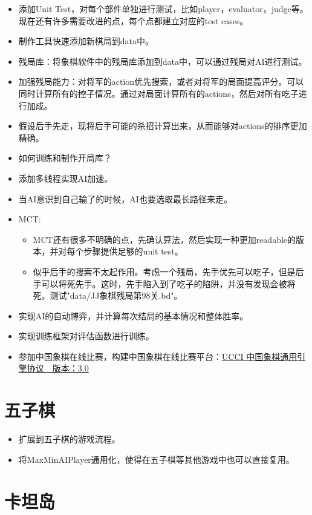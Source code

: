 \documentclass[export, 12pt, letterpaper]{ctexrep}
\begin{document}
\begin{itemize}
\item{ 添加Unit Test，对每个部件单独进行测试，比如player，evaluator，judge等。现在还有许多需要改进的点，每个点都建立对应的test cases。 }
\item{ 制作工具快速添加新棋局到data中。 }
\item{ 残局库：将象棋软件中的残局库添加到data中，可以通过残局对AI进行测试。 }
\item{ 加强残局能力：对将军的action优先搜索，或者对将军的局面提高评分。可以同时计算所有的控子情况。通过对局面计算所有的actions，然后对所有吃子进行加成。 }
\item{ 假设后手先走，现将后手可能的杀招计算出来，从而能够对actions的排序更加精确。 }
\item{ 如何训练和制作开局库？ }
\item{ 添加多线程实现AI加速。 }
\item{ 当AI意识到自己输了的时候，AI也要选取最长路径来走。 }
\item{ MCT:
\begin{itemize}
\item{ MCT还有很多不明确的点，先确认算法，然后实现一种更加readable的版本，并对每个步骤提供足够的unit test。 }
\item{ 似乎后手的搜索不太起作用。考虑一个残局，先手优先可以吃子，但是后手可以将死先手。这时，先手陷入到了吃子的陷阱，并没有发现会被将死。测试"data/JJ象棋残局第98关.bd"。 }
\end{itemize}
 }
\item{ 实现AI的自动博弈，并计算每次结局的基本情况和整体胜率。 }
\item{ 实现训练框架对评估函数进行训练。 }
\item{ 参加中国象棋在线比赛，构建中国象棋在线比赛平台：\href{https://www.xqbase.com/protocol/cchess_ucci.htm}{UCCI 中国象棋通用引擎协议　版本：3.0} }
\end{itemize}



\section{五子棋}


\begin{itemize}
\item{ 扩展到五子棋的游戏流程。 }
\item{ 将MaxMinAIPlayer通用化，使得在五子棋等其他游戏中也可以直接复用。 }
\end{itemize}


\section{卡坦岛}
\end{document}
